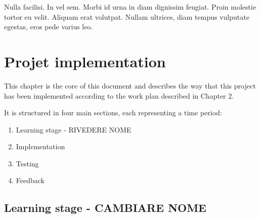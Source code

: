 \begin{savequote}[75mm]
Nulla facilisi. In vel sem. Morbi id urna in diam dignissim feugiat. Proin molestie tortor eu velit. Aliquam erat volutpat. Nullam ultrices, diam tempus vulputate egestas, eros pede varius leo.
\end{savequote}

\chapter{Projet implementation}

This chapter is the core of this document and describes the way that this project has been implemented according to the work plan described in Chapter 2.

It is structured in four main sections, each representing a time period:
\begin{enumerate}
	\item Learning stage - RIVEDERE NOME
	\item Implementation
	\item Testing
	\item Feedback
\end{enumerate}

\section{Learning stage - CAMBIARE NOME}


